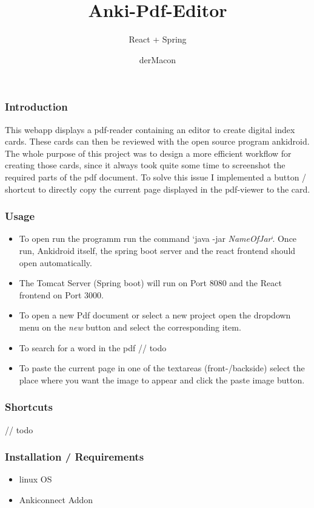 \documentclass[xcolor=dvipanames]{beamer}
\title{Anki-Pdf-Editor}
\subtitle{React + Spring}
\author{derMacon}
\makeatletter
\newcommand\listofframes{\@starttoc{lbf}}
\makeatother
\begin{document}
	\begin{frame}
		\titlepage
	\end{frame}
	
	\begin{frame}
		\listofframes
	\end{frame}
		
	\begin{frame}
		\frametitle{Introduction}
		This webapp displays a pdf-reader containing an editor to create digital index cards. These cards can then be reviewed with the open source program ankidroid. The whole purpose of this project was to design a more efficient workflow for creating those cards, since it always took quite some time to screenshot the required parts of the pdf document. To solve this issue I implemented a button / shortcut to directly copy the current page displayed in the pdf-viewer to the card.
	\end{frame}
	
	\begin{frame}
		\frametitle{Usage}
		\begin{itemize}
			\item To open run the programm run the command `java -jar \emph{NameOfJar}`. Once run, Ankidroid itself, the spring boot server and the react frontend should open automatically. 
		
			\item The Tomcat Server (Spring boot) will run on Port 8080 and the React frontend on Port 3000.
			
			\item To open a new Pdf document or select a new project open the dropdown menu on the \emph{new} button and select the corresponding item.
			
			\item To search for a word in the pdf // todo
			
			\item To paste the current page in one of the textareas (front-/backside) select the place where you want the image to appear and click the paste image button.
			
		\end{itemize}	
		
	\end{frame}
	
	\begin{frame}
		\frametitle{Shortcuts}
		// todo
	\end{frame}
	
	\begin{frame}
		\frametitle{Installation / Requirements}
		\begin{itemize}
			\item linux OS
			\item Ankiconnect Addon
		\end{itemize}
	\end{frame}
	
\end{document}
